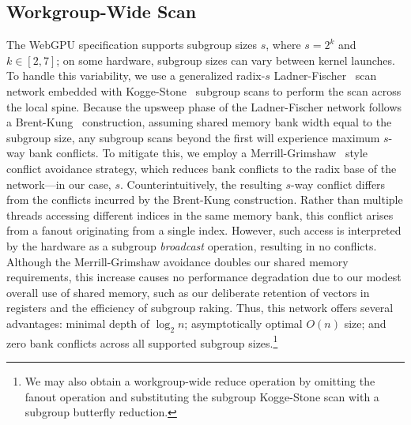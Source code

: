\documentclass[sigconf]{acmart}
\begin{document}
\subsection{Workgroup-Wide Scan}
The WebGPU specification supports subgroup sizes $s$, where $s = 2^k$ and $k \in [2, 7]$; on some hardware, subgroup sizes can vary between kernel launches. To handle this variability, we use a generalized radix-$s$ Ladner-Fischer~\cite{10.1145/322217.322232} scan network embedded with Kogge-Stone~\cite{5009159} subgroup scans to perform the scan across the local spine. Because the upsweep phase of the Ladner-Fischer network follows a Brent-Kung~\cite{1675982} construction, assuming shared memory bank width equal to the subgroup size, any subgroup scans beyond the first will experience maximum $s$-way bank conflicts. To mitigate this, we employ a Merrill-Grimshaw~\cite[Section 3.3.5]{Merrill2009} style conflict avoidance strategy, which reduces bank conflicts to the radix base of the network—in our case, $s$. Counterintuitively, the resulting $s$-way conflict differs from the conflicts incurred by the Brent-Kung construction. Rather than multiple threads accessing different indices in the same memory bank, this conflict arises from a fanout originating from a single index. However, such access is interpreted by the hardware as a subgroup \emph{broadcast} operation, resulting in no conflicts. Although the Merrill-Grimshaw avoidance doubles our shared memory requirements, this increase causes no performance degradation due to our modest overall use of shared memory, such as our deliberate retention of vectors in registers and the efficiency of subgroup raking. Thus, this network offers several advantages: minimal depth of $\log_2 n$; asymptotically optimal $O(n)$ size; and zero bank conflicts across all supported subgroup sizes.\footnote{We may also obtain a workgroup-wide reduce operation by omitting the fanout operation and substituting the subgroup Kogge-Stone scan with a subgroup butterfly reduction.}
\end{document}
